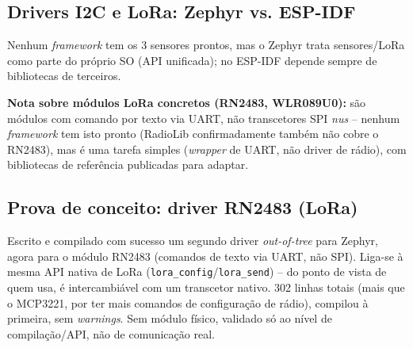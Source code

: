 \documentclass[a4paper,11pt]{article}
\begin{document}
\subsection{Drivers I2C e LoRa: Zephyr vs. ESP-IDF}
\begin{center}
\end{center}
Nenhum \textit{framework} tem os 3 sensores prontos, mas o Zephyr trata sensores/LoRa como parte do próprio SO (API unificada); no ESP-IDF depende sempre de bibliotecas de terceiros.

\textbf{Nota sobre módulos LoRa concretos (RN2483, WLR089U0):} são módulos com comando por texto via UART, não transcetores SPI \textit{nus} -- nenhum \textit{framework} tem isto pronto (RadioLib confirmadamente também não cobre o RN2483), mas é uma tarefa simples (\textit{wrapper} de UART, não driver de rádio), com bibliotecas de referência publicadas para adaptar.

\subsection{Prova de conceito: driver RN2483 (LoRa)}
Escrito e compilado com sucesso um segundo driver \textit{out-of-tree} para Zephyr, agora para o módulo RN2483 (comandos de texto via UART, não SPI). Liga-se à mesma API nativa de LoRa (\texttt{lora\_config}/\texttt{lora\_send}) -- do ponto de vista de quem usa, é intercambiável com um transcetor nativo. 302 linhas totais (mais que o MCP3221, por ter mais comandos de configuração de rádio), compilou à primeira, sem \textit{warnings}. Sem módulo físico, validado só ao nível de compilação/API, não de comunicação real.
\end{document}
